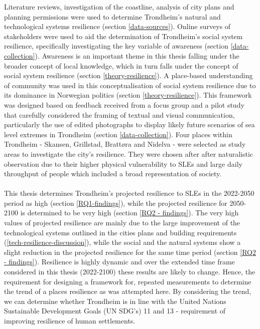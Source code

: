 Literature reviews, investigation of the coastline, analysis of city plans and planning permissions were used to determine Trondheim's natural and technological systems resilience (section \ref{data-sources}). Online surveys of stakeholders were used to aid the determination of Trondheim's social system resilience, specifically investigating the key variable of awareness (section \ref{data-collection}). Awareness is an important theme in this thesis falling under the broader concept of local knowledge, which in turn falls under the concept of social system resilience (section \ref{theory-resilience}). A place-based understanding of community was used in this conceptualisation of social system resilience due to its dominance in Norwegian politics (section \ref{theory-resilience}). This framework was designed based on feedback received from a focus group and a pilot study that carefully considered the framing of textual and visual communication, particularly the use of edited photographs to display likely future scenarios of sea level extremes in Trondheim (section \ref{data-collection}). Four places within Trondheim - Skansen, Grillstad, Brattøra and Nidelva - were selected as study areas to investigate the city's resilience. They were chosen after after naturalistic observation due to their higher physical vulnerability to SLEs and large daily throughput of people which included a broad representation of society.

\paragraph{}
This thesis determines Trondheim's projected resilience to SLEs in the 2022-2050 period as high (section \ref{RQ1-findings}), while the projected resilience for 2050-2100 is determined to be very high (section \ref{RQ2 - findings}). The very high values of projected resilience are mainly due to the large improvement of the technological systems outlined in the cities plans and building requirements (\ref{tech-resilience-discussion}), while the social and the natural systems show a slight reduction  in the projected resilience for the same time period (section \ref{RQ2 - findings}). Resilience is highly dynamic and over the extended time frame considered in this thesis (2022-2100) these results are likely to change. Hence, the requirement for designing a framework for, repeated measurements to determine the trend of a places resilience as was attempted here. By considering the trend, we can determine whether Trondheim is in line with the United Nations Sustainable Development Goals (UN SDG’s) 11 and 13 - requirement of improving resilience of human settlements.

